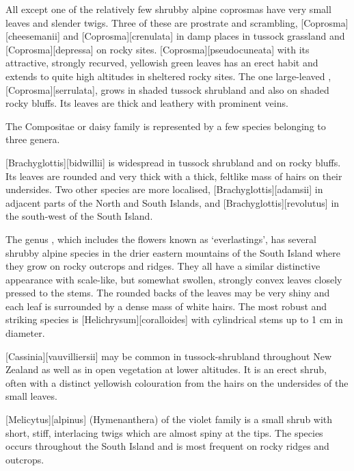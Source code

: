 All except one of the relatively few shrubby alpine coprosmas have very small leaves and slender twigs.
Three of these are prostrate and scrambling, [Coprosma][cheesemanii]  and [Coprosma][crenulata] in damp places in tussock grassland and [Coprosma][depressa]  on rocky sites. [Coprosma][pseudocuneata] with its attractive, strongly recurved, yellowish green leaves has an erect habit and extends to quite high altitudes in sheltered rocky sites.
The one large-leaved , [Coprosma][serrulata], grows in shaded tussock shrubland  and also on shaded rocky bluffs.
Its leaves are thick and leathery with prominent veins.

The Compositae or daisy family is represented by a few species belonging to three genera.

[Brachyglottis][bidwillii] is widespread in tussock shrubland and on rocky bluffs.
Its leaves are rounded and very thick with a thick, feltlike mass of hairs on their undersides.
Two other species are more localised, [Brachyglottis][adamsii] in adjacent parts of the North and South Islands, and [Brachyglottis][revolutus] in the south-west of the South Island.

The genus , which includes the flowers known as `everlastings', has several shrubby alpine species in the drier eastern mountains of the South Island where they grow on rocky outcrops and ridges.
They all have a similar distinctive appearance with scale-like, but somewhat swollen, strongly convex leaves closely pressed to the stems.
The rounded backs of the leaves may be very shiny and each leaf is surrounded by a dense mass of white hairs.
The most robust and striking species is [Helichrysum][coralloides] with cylindrical stems up to 1 cm in diameter.

[Cassinia][vauvilliersii] may be common in tussock-shrubland throughout New Zealand as well as in open vegetation at lower altitudes.
It is an erect shrub, often with a distinct yellowish colouration from the hairs on the undersides of the small leaves.

[Melicytus][alpinus] (Hymenanthera) of the violet family is a small shrub with short, stiff, interlacing twigs which are almost spiny at the tips.
The species occurs throughout the South Island and is most frequent on rocky ridges and outcrops.

